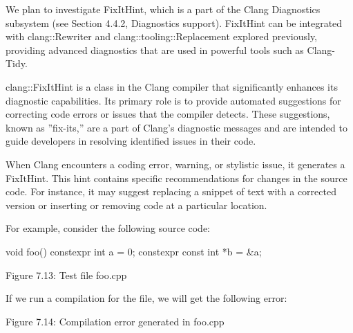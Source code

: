 We plan to investigate FixItHint, which is a part of the Clang Diagnostics subsystem (see Section 4.4.2, Diagnostics support). FixItHint can be integrated with clang::Rewriter and clang::tooling::Replacement explored previously, providing advanced diagnostics that are used in powerful tools such as Clang-Tidy.



clang::FixItHint is a class in the Clang compiler that significantly enhances its diagnostic capabilities. Its primary role is to provide automated suggestions for correcting code errors or issues that the compiler detects. These suggestions, known as ”fix-its,” are a part of Clang’s diagnostic messages and are intended to guide developers in resolving identified issues in their code.

When Clang encounters a coding error, warning, or stylistic issue, it generates a FixItHint. This hint contains specific recommendations for changes in the source code. For instance, it may suggest replacing a snippet of text with a corrected version or inserting or removing code at a particular location.

For example, consider the following source code:

\begin{cpp}
void foo() {
  constexpr int a = 0;
  constexpr const int *b = &a;
}
\end{cpp}

\begin{center}
Figure 7.13: Test file foo.cpp
\end{center}

If we run a compilation for the file, we will get the following error:


\begin{center}
Figure 7.14: Compilation error generated in foo.cpp
\end{center}

